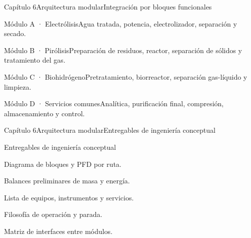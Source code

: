 \documentclass{../plantilla/hvtbook}
\begin{document}
\begin{HVTPage}{Capítulo 6}{Arquitectura modular}{Integración por bloques funcionales}
\begin{HVTGrid}
\begin{HVTColumn}{Módulo A · Electrólisis}Agua tratada, potencia, electrolizador, separación y secado.\end{HVTColumn}
\begin{HVTColumn}{Módulo B · Pirólisis}Preparación de residuos, reactor, separación de sólidos y tratamiento del gas.\end{HVTColumn}
\begin{HVTColumn}{Módulo C · Biohidrógeno}Pretratamiento, biorreactor, separación gas-líquido y limpieza.\end{HVTColumn}
\begin{HVTColumn}{Módulo D · Servicios comunes}Analítica, purificación final, compresión, almacenamiento y control.\end{HVTColumn}
\end{HVTGrid}
\end{HVTPage}

\begin{HVTPage}{Capítulo 6}{Arquitectura modular}{Entregables de ingeniería conceptual}
\begin{HVTTask}{Entregables de ingeniería conceptual}\item Diagrama de bloques y PFD por ruta. \item Balances preliminares de masa y energía. \item Lista de equipos, instrumentos y servicios. \item Filosofía de operación y parada. \item Matriz de interfaces entre módulos.\end{HVTTask}
\end{HVTPage}
\end{document}
